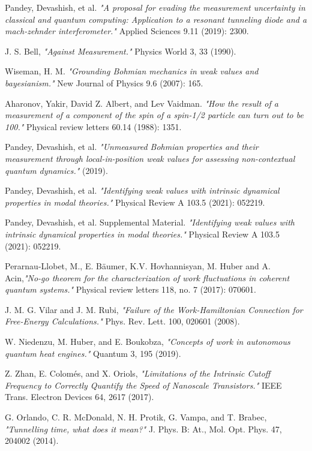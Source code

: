 \documentclass[11pt, a4paper]{article} %
\begin{document}
\begin{thebibliography}{1}
{
Pandey, Devashish, et al. {\em "A proposal for evading the measurement uncertainty in classical and quantum computing: Application to a resonant tunneling diode and a mach-zehnder interferometer."} Applied Sciences 9.11 (2019): 2300.

J. S. Bell, {\em "Against Measurement."} Physics World 3, 33 (1990).

Wiseman, H. M. {\em "Grounding Bohmian mechanics in weak values and bayesianism."} New Journal of Physics 9.6 (2007): 165.

Aharonov, Yakir, David Z. Albert, and Lev Vaidman. {\em "How the result of a measurement of a component of the spin of a spin-1/2 particle can turn out to be 100."} Physical review letters 60.14 (1988): 1351.

Pandey, Devashish, et al. {\em "Unmeasured Bohmian properties and their measurement through local-in-position weak values for assessing non-contextual quantum dynamics."} (2019).

Pandey, Devashish, et al. {\em "Identifying weak values with intrinsic dynamical properties in modal theories."} Physical Review A 103.5 (2021): 052219.

Pandey, Devashish, et al. Supplemental Material. {\em "Identifying weak values with intrinsic dynamical properties in modal theories."} Physical Review A 103.5 (2021): 052219.

Perarnau-Llobet, M., E. Bäumer, K.V. Hovhannisyan, M. Huber and A. Acin,{\em "No-go theorem for the characterization of work fluctuations in coherent quantum systems."} Physical review letters 118, no. 7 (2017): 070601.

J. M. G. Vilar and J. M. Rubi, {\em "Failure of the Work-Hamiltonian Connection for Free-Energy Calculations." }Phys. Rev. Lett. 100, 020601 (2008).

W. Niedenzu, M. Huber, and E. Boukobza, {\em "Concepts of work in autonomous quantum heat engines."} Quantum 3, 195 (2019).

Z. Zhan, E. Colomés, and X. Oriols, {\em  "Limitations of the Intrinsic Cutoff Frequency to Correctly Quantify the Speed of Nanoscale Transistors."} IEEE Trans. Electron Devices 64, 2617 (2017).

G. Orlando, C. R. McDonald, N. H. Protik, G. Vampa, and T. Brabec, {\em "Tunnelling time, what does it mean?"} J. Phys. B: At., Mol. Opt. Phys. 47, 204002 (2014).

}
\end{thebibliography}
\end{document}
